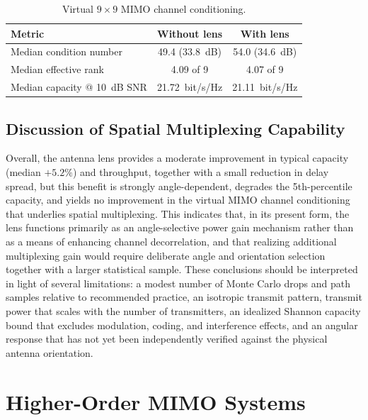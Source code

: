 \begin{table}[htbp]
    \centering
    \caption{Virtual $9\times9$ MIMO channel conditioning.}
    \label{tab:mc9x9-mimo}
    \begin{tabular}{lcc}
        \toprule
        \textbf{Metric} & \textbf{Without lens} & \textbf{With lens} \\
        \midrule
        Median condition number & 49.4 (33.8~dB) & 54.0 (34.6~dB) \\
        Median effective rank & 4.09 of 9 & 4.07 of 9 \\
        Median capacity @ 10~dB SNR & 21.72~bit/s/Hz & 21.11~bit/s/Hz \\
        \bottomrule
    \end{tabular}
\end{table}

\subsection{Discussion of Spatial Multiplexing Capability}

Overall, the antenna lens provides a moderate improvement in typical capacity (median $+5.2\%$) and throughput, together with a small reduction in delay spread, but this benefit is strongly angle-dependent, degrades the 5th-percentile capacity, and yields no improvement in the virtual MIMO channel conditioning that underlies spatial multiplexing. This indicates that, in its present form, the lens functions primarily as an angle-selective power gain mechanism rather than as a means of enhancing channel decorrelation, and that realizing additional multiplexing gain would require deliberate angle and orientation selection together with a larger statistical sample. These conclusions should be interpreted in light of several limitations: a modest number of Monte Carlo drops and path samples relative to recommended practice, an isotropic transmit pattern, transmit power that scales with the number of transmitters, an idealized Shannon capacity bound that excludes modulation, coding, and interference effects, and an angular response that has not yet been independently verified against the physical antenna orientation.

\section{Higher-Order MIMO Systems}

